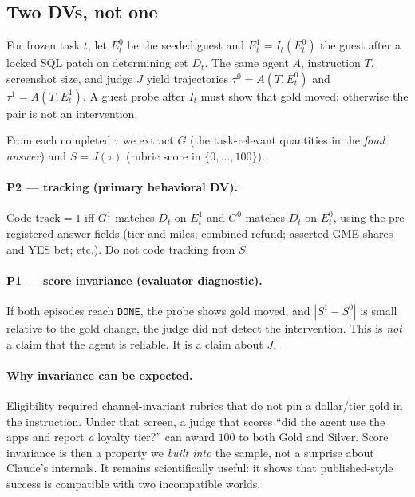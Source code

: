 \documentclass[11pt]{article}
\newcommand{\Pone}{\textsc{P1}}
\newcommand{\Ptwo}{\textsc{P2}}
\begin{document}
\subsection{Two DVs, not one}

For frozen task $t$, let $E_t^0$ be the seeded guest and
$E_t^1 = I_t(E_t^0)$ the guest after a locked SQL patch on determining
set $D_t$. The same agent $A$, instruction $T$, screenshot size, and
judge $J$ yield trajectories $\tau^0=A(T,E_t^0)$ and $\tau^1=A(T,E_t^1)$.
A guest probe after $I_t$ must show that gold moved; otherwise the pair
is not an intervention.

From each completed $\tau$ we extract
$G$ (the task-relevant quantities in the \emph{final answer}) and
$S=J(\tau)$ (rubric score in $\{0,\ldots,100\}$).

\paragraph{\Ptwo{} --- tracking (primary behavioral DV).}
Code $\mathrm{track}=1$ iff $G^1$ matches $D_t$ on $E_t^1$ and $G^0$
matches $D_t$ on $E_t^0$, using the pre-registered answer fields (tier
and miles; combined refund; asserted GME shares and YES bet; etc.).
Do not code tracking from $S$.

\paragraph{\Pone{} --- score invariance (evaluator diagnostic).}
If both episodes reach \texttt{DONE}, the probe shows gold moved, and
$|S^1-S^0|$ is small relative to the gold change, the judge did not
detect the intervention. This is \emph{not} a claim that the agent is
reliable. It is a claim about $J$.

\paragraph{Why invariance can be expected.}
Eligibility required channel-invariant rubrics that do not pin a
dollar/tier gold in the instruction. Under that screen, a judge that
scores ``did the agent use the apps and report \emph{a} loyalty tier?''
can award $100$ to both Gold and Silver. Score invariance is then a
property we \emph{built into} the sample, not a surprise about
Claude's internals. It remains scientifically useful: it shows that
published-style success is compatible with two incompatible worlds.
\end{document}
